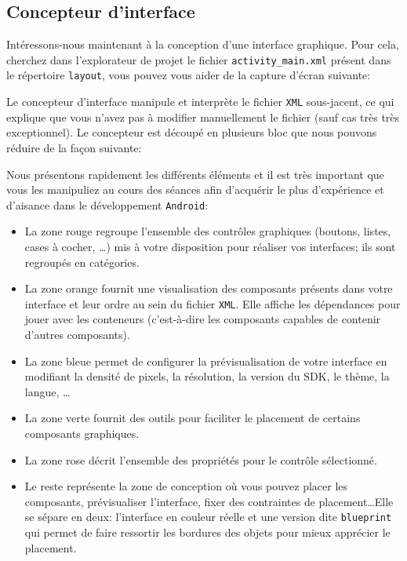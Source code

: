 \documentclass[a4paper,10pt]{article}
\begin{document}
\subsection{Concepteur d'interface}

Intéressons-nous maintenant à la conception d'une interface graphique. Pour cela, cherchez dans l'explorateur de projet le fichier \texttt{activity\_main.xml} présent dans le répertoire \texttt{layout}, vous pouvez vous aider de la capture d'écran suivante:

\begin{center}
\end{center}

Le concepteur d'interface manipule et interprète le fichier \texttt{XML} sous-jacent, ce qui explique que vous n'avez pas à modifier manuellement le fichier (sauf cas très très exceptionnel). Le concepteur est découpé en plusieurs bloc que nous pouvons réduire de la façon suivante:

\begin{center}
\end{center}

Nous présentons rapidement les différents éléments et il est très important que vous les manipuliez au cours des séances afin d'acquérir le plus d'expérience et d'aisance dans le développement \texttt{Android}:
\begin{itemize}
	\item La zone rouge regroupe l'ensemble des contrôles graphiques (boutons, listes, cases à cocher, \ldots) mis à votre disposition pour réaliser vos interfaces; ils sont regroupés en catégories.
	\item La zone orange fournit une visualisation des composants présents dans votre interface et leur ordre au sein du fichier \texttt{XML}. Elle affiche les dépendances pour jouer avec les conteneurs (c'est-à-dire les composants capables de contenir d'autres composants).
	\item La zone bleue permet de configurer la prévisualisation de votre interface en modifiant la densité de pixels, la résolution, la version du SDK, le thème, la langue, \ldots
	\item La zone verte fournit des outils pour faciliter le placement de certains composants graphiques.
	\item La zone rose décrit l'ensemble des propriétés pour le contrôle sélectionné.
	\item Le reste représente la zone de conception où vous pouvez placer les composants, prévisualiser l'interface, fixer des contraintes de placement\ldots Elle se sépare en deux: l'interface en couleur réelle et une version dite \texttt{blueprint} qui permet de faire ressortir les bordures des objets pour mieux apprécier le placement.
\end{itemize}
\end{document}
